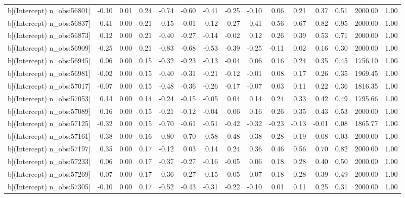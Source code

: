 \begin{table}[ht]
\begin{tabular}{rrrrrrrrrrrrrrr}
  b[(Intercept) n\_obs:56801] & -0.10 & 0.01 & 0.24 & -0.74 & -0.60 & -0.41 & -0.25 & -0.10 & 0.06 & 0.21 & 0.37 & 0.51 & 2000.00 & 1.00 \\ 
  b[(Intercept) n\_obs:56837] & 0.41 & 0.00 & 0.21 & -0.15 & -0.01 & 0.12 & 0.27 & 0.41 & 0.56 & 0.67 & 0.82 & 0.95 & 2000.00 & 1.00 \\ 
  b[(Intercept) n\_obs:56873] & 0.12 & 0.00 & 0.21 & -0.40 & -0.27 & -0.14 & -0.02 & 0.12 & 0.26 & 0.39 & 0.53 & 0.71 & 2000.00 & 1.00 \\ 
  b[(Intercept) n\_obs:56909] & -0.25 & 0.00 & 0.21 & -0.83 & -0.68 & -0.53 & -0.39 & -0.25 & -0.11 & 0.02 & 0.16 & 0.30 & 2000.00 & 1.00 \\ 
  b[(Intercept) n\_obs:56945] & 0.06 & 0.00 & 0.15 & -0.32 & -0.23 & -0.13 & -0.04 & 0.06 & 0.16 & 0.24 & 0.35 & 0.45 & 1756.10 & 1.00 \\ 
  b[(Intercept) n\_obs:56981] & -0.02 & 0.00 & 0.15 & -0.40 & -0.31 & -0.21 & -0.12 & -0.01 & 0.08 & 0.17 & 0.26 & 0.35 & 1969.45 & 1.00 \\ 
  b[(Intercept) n\_obs:57017] & -0.07 & 0.00 & 0.15 & -0.48 & -0.36 & -0.26 & -0.17 & -0.07 & 0.03 & 0.11 & 0.22 & 0.36 & 1816.35 & 1.00 \\ 
  b[(Intercept) n\_obs:57053] & 0.14 & 0.00 & 0.14 & -0.24 & -0.15 & -0.05 & 0.04 & 0.14 & 0.24 & 0.33 & 0.42 & 0.49 & 1795.66 & 1.00 \\ 
  b[(Intercept) n\_obs:57089] & 0.16 & 0.00 & 0.15 & -0.21 & -0.12 & -0.04 & 0.06 & 0.16 & 0.26 & 0.35 & 0.43 & 0.53 & 2000.00 & 1.00 \\ 
  b[(Intercept) n\_obs:57125] & -0.32 & 0.00 & 0.15 & -0.70 & -0.61 & -0.51 & -0.42 & -0.32 & -0.23 & -0.13 & -0.01 & 0.08 & 1865.77 & 1.00 \\ 
  b[(Intercept) n\_obs:57161] & -0.38 & 0.00 & 0.16 & -0.80 & -0.70 & -0.58 & -0.48 & -0.38 & -0.28 & -0.19 & -0.08 & 0.03 & 2000.00 & 1.00 \\ 
  b[(Intercept) n\_obs:57197] & 0.35 & 0.00 & 0.17 & -0.12 & 0.03 & 0.14 & 0.24 & 0.36 & 0.46 & 0.56 & 0.70 & 0.82 & 2000.00 & 1.00 \\ 
  b[(Intercept) n\_obs:57233] & 0.06 & 0.00 & 0.17 & -0.37 & -0.27 & -0.16 & -0.05 & 0.06 & 0.18 & 0.28 & 0.40 & 0.50 & 2000.00 & 1.00 \\ 
  b[(Intercept) n\_obs:57269] & 0.07 & 0.00 & 0.17 & -0.36 & -0.27 & -0.15 & -0.05 & 0.07 & 0.18 & 0.28 & 0.39 & 0.49 & 2000.00 & 1.00 \\ 
  b[(Intercept) n\_obs:57305] & -0.10 & 0.00 & 0.17 & -0.52 & -0.43 & -0.31 & -0.22 & -0.10 & 0.01 & 0.11 & 0.25 & 0.31 & 2000.00 & 1.00 \\ 

\end{tabular}
\end{table}
